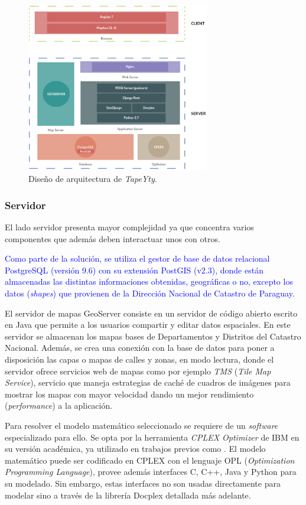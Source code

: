 \documentclass[spanish, conference]{IEEEtran}
\begin{document}
{\begin{figure}[htbp]
\centerline{\includegraphics[width=8cm]{imagenes/TapeYtyArchitectureDesign.png}}
\caption{Diseño de arquitectura de \textit{TapeYty}.}
\label{fig:disenhoArquitectura}
\end{figure}

\subsubsection{Servidor}

El lado servidor presenta mayor complejidad ya que concentra varios componentes que además deben interactuar unos con otros.

\textcolor{blue}{Como parte de la solución, se utiliza el gestor de base de datos relacional PostgreSQL (versión 9.6) con su extensión PostGIS (v2.3), donde están almacenadas las distintas informaciones obtenidas, geográficas o no, excepto los datos (\textit{shapes}) que provienen de la Dirección Nacional de Catastro de Paraguay.}

El servidor de mapas GeoServer consiste en un servidor de código abierto escrito en Java que permite a los usuarios compartir y editar datos espaciales. En este servidor se almacenan los mapas bases de Departamentos y Distritos del Catastro Nacional. Además, se crea una conexión con la base de datos para poner a disposición las capas o mapas de calles y zonas, en modo lectura, donde el servidor ofrece servicios web de mapas como por ejemplo \textit{TMS} (\textit{Tile Map Service}), servicio que maneja estrategias de caché de cuadros de imágenes para mostrar los mapas con mayor velocidad dando un mejor rendimiento (\textit{performance}) a la aplicación.

Para resolver el modelo matemático seleccionado se requiere de un \textit{software} especializado para ello. Se opta por la herramienta \textit{CPLEX Optimizer} de IBM en su versión académica, ya utilizado en trabajos previos como \cite{Vecchi2016ACollection}  \cite{Ramos2018TheApproaches} \cite{BabaeeTirkolaee2019DevelopingStudy}. El modelo matemático puede ser codificado en CPLEX con el lenguaje OPL ({\textit{Optimization Programming Language}}), provee además interfaces C, C++, Java y Python para su modelado. Sin embargo, estas interfaces no son usadas directamente para modelar sino a través de la librería Docplex detallada más adelante.

}
\end{document}
